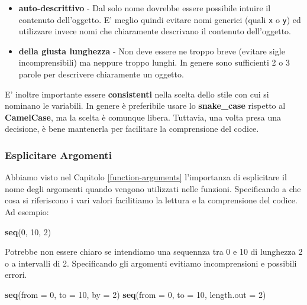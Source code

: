 \documentclass[
]{book}
\newenvironment{Shaded}{\begin{snugshade}}{\end{snugshade}}
\newcommand{\DataTypeTok}[1]{\textcolor[rgb]{0.13,0.29,0.53}{#1}}
\newcommand{\DecValTok}[1]{\textcolor[rgb]{0.00,0.00,0.81}{#1}}
\newcommand{\KeywordTok}[1]{\textcolor[rgb]{0.13,0.29,0.53}{\textbf{#1}}}
\newcommand{\NormalTok}[1]{#1}
\providecommand{\tightlist}{%
  \setlength{\itemsep}{0pt}\setlength{\parskip}{0pt}}
\begin{document}
\begin{itemize}
\tightlist
\item
  \textbf{auto-descrittivo} - Dal solo nome dovrebbe essere possibile intuire il contenuto dell'oggetto. E' meglio quindi evitare nomi generici (quali \texttt{x} o \texttt{y}) ed utilizzare invece nomi che chiaramente descrivano il contenuto dell'oggetto.
\item
  \textbf{della giusta lunghezza} - Non deve essere ne troppo breve (evitare sigle incomprensibili) ma neppure troppo lunghi. In genere sono sufficienti 2 o 3 parole per descrivere chiaramente un oggetto.
\end{itemize}

E' inoltre importante essere \textbf{consistenti} nella scelta dello stile con cui si nominano le variabili. In genere è preferibile usare lo \textbf{snake\_case} rispetto al \textbf{CamelCase}, ma la scelta è comunque libera. Tuttavia, una volta presa una decisione, è bene mantenerla per facilitare la comprensione del codice.

\hypertarget{esplicitare-argomenti}{%
\subsubsection*{Esplicitare Argomenti}\label{esplicitare-argomenti}}

Abbiamo visto nel Capitolo \ref{function-arguments} l'importanza di esplicitare il nome degli argomenti quando vengono utilizzati nelle funzioni. Specificando a che cosa si riferiscono i vari valori facilitiamo la lettura e la comprensione del codice. Ad esempio:

\begin{Shaded}
\begin{Highlighting}[]
\KeywordTok{seq}\NormalTok{(}\DecValTok{0}\NormalTok{, }\DecValTok{10}\NormalTok{, }\DecValTok{2}\NormalTok{)}
\end{Highlighting}
\end{Shaded}

Potrebbe non essere chiaro se intendiamo una sequennza tra 0 e 10 di lunghezza 2 o a intervalli di 2. Specificando gli argomenti evitiamo incomprensioni e possibili errori.

\begin{Shaded}
\begin{Highlighting}[]
\KeywordTok{seq}\NormalTok{(}\DataTypeTok{from =} \DecValTok{0}\NormalTok{, }\DataTypeTok{to =} \DecValTok{10}\NormalTok{, }\DataTypeTok{by =} \DecValTok{2}\NormalTok{)}
\KeywordTok{seq}\NormalTok{(}\DataTypeTok{from =} \DecValTok{0}\NormalTok{, }\DataTypeTok{to =} \DecValTok{10}\NormalTok{, }\DataTypeTok{length.out =} \DecValTok{2}\NormalTok{)}
\end{Highlighting}
\end{Shaded}
\end{document}
